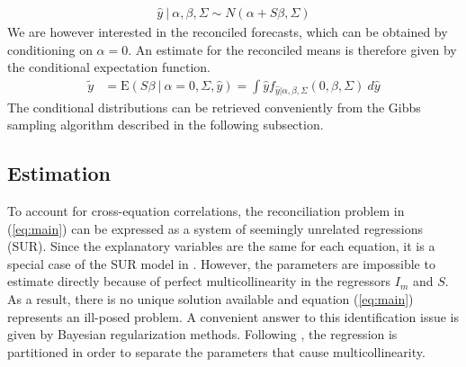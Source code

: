 \documentclass[a4paper,fleqn,11pt]{article}
\begin{document}
\begin{align}
\hat{y}\ |\ \alpha,\beta,\Sigma \sim N(\alpha + S\beta,\Sigma)
\end{align}
We are however interested in the reconciled forecasts, which can be obtained by conditioning on $\alpha = 0$. An estimate for the reconciled means is therefore given by the conditional expectation function.
\begin{align*}
\tilde{y} &= \text{E}(S\beta\ |\ \alpha = 0,\Sigma, \hat{y}) = \int \hat{y} f_{\hat{y}|\alpha,\beta,\Sigma}(0,\beta,\Sigma)\ d\hat{y}
\end{align*}
The conditional distributions can be retrieved conveniently from the Gibbs sampling algorithm described in the following subsection. 


\subsection{Estimation}
To account for cross-equation correlations, the reconciliation problem in (\ref{eq:main}) can be expressed as a system of seemingly unrelated regressions (SUR). Since the explanatory variables are the same for each equation, it is a special case of the SUR model in \cite{Zellner1962}. However, the parameters are impossible to estimate directly because of perfect multicollinearity in the regressors $I_m$ and $S$. As a result, there is no unique solution available and equation (\ref{eq:main}) represents an ill-posed problem. A convenient answer to this identification issue is given by Bayesian regularization methods. Following \cite{Farebrother1978}, the regression is partitioned in order to separate the parameters that cause multicollinearity.\\
\end{document}
